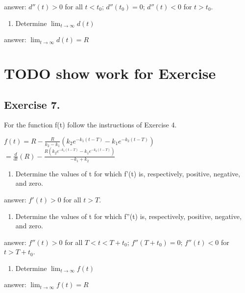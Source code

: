 \documentclass[]{article}
\providecommand{\tightlist}{%
  \setlength{\itemsep}{0pt}\setlength{\parskip}{0pt}}
\begin{document}
answer: \(d''(t) > 0\) for all \(t < t_0\); \(d''(t_0) =0\);
\(d''(t) < 0\) for \(t > t_0\).

\begin{enumerate}
\def\labelenumi{(\alph{enumi})}
\setcounter{enumi}{2}
\tightlist
\item
  Determine \(\lim_{t\to\infty}d(t)\)
\end{enumerate}

answer: \(\lim_{t\to\infty}d(t) =R\)

\section{TODO show work for
Exercise}\label{todo-show-work-for-exercise-1}

\subsection{Exercise 7.}\label{exercise-7.}

For the function f(t) follow the instructions of Exercise 4.

\(f(t) = R - \frac{R}{k_2 - k_1}(k_2 e^{-k_1(t-T)}-k_1 e^{-k_2(t-T)})\)
\(=\frac{d}{dt}(R) - \frac{R (k_2 e^{-k_1(t-T)}-k_1 e^{-k_2(t-T)})}{- k_1+k_2}\)

\begin{enumerate}
\def\labelenumi{(\alph{enumi})}
\tightlist
\item
  Determine the values of t for which f'(t) is, respectively, positive,
  negative, and zero.
\end{enumerate}

answer: \(f'(t) > 0\) for all \(t > T\).

\begin{enumerate}
\def\labelenumi{(\alph{enumi})}
\setcounter{enumi}{1}
\tightlist
\item
  Determine the values of t for which f''(t) is, respectively, positive,
  negative, and zero.
\end{enumerate}

answer: \(f''(t) > 0\) for all \(T < t < T + t_0\); \(f''(T + t_0) =0\);
\(f''(t) < 0\) for \(t > T + t_0\).

\begin{enumerate}
\def\labelenumi{(\alph{enumi})}
\setcounter{enumi}{2}
\tightlist
\item
  Determine \(\lim_{t\to\infty}f(t)\)
\end{enumerate}

answer: \(\lim_{t\to\infty}f(t) =R\)
\end{document}
